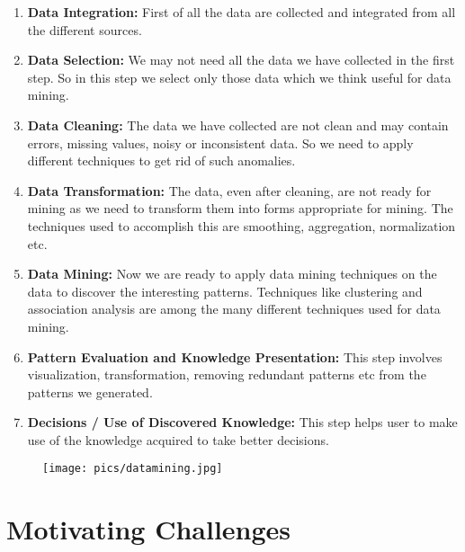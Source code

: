 	\begin{enumerate}
		\item {\bf Data Integration:} First of all the data are collected and integrated from all the 
		different sources.
		\item {\bf Data Selection:} We may not need all the data we have collected in the first step. So in this 
		step we select only those data which we think useful for data mining.
		\item {\bf Data Cleaning:} The data we have collected are not clean and may contain errors, missing values,
		noisy or inconsistent data. So we need to apply different techniques to get rid of such anomalies.
		\item {\bf Data Transformation:} The data, even after cleaning, are not ready for mining as we need to 
		transform them into forms appropriate for mining. The techniques used to accomplish this are smoothing,
		aggregation, normalization etc.
		\item {\bf Data Mining:} Now we are ready to apply data mining techniques on the data to discover the 
		interesting patterns. Techniques like clustering and association analysis are among the many different
		techniques used for data mining.
		\item {\bf Pattern Evaluation and Knowledge Presentation:} This step involves visualization, 
		transformation, removing redundant patterns etc from the patterns we generated.
		\item {\bf Decisions / Use of Discovered Knowledge:} This step helps user to make use of the knowledge acquired to take better decisions.
	\end{enumerate}

		\begin{figure}[H]
			\texttt{[image: pics/datamining.jpg]}
		\end{figure}

\clearpage
\section{Motivating Challenges}

